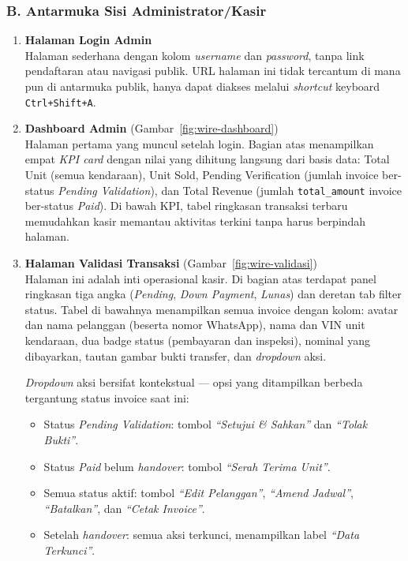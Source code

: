 \documentclass[11pt, a5paper]{article}
\begin{document}
\subsubsection*{B. Antarmuka Sisi Administrator/Kasir}

\begin{enumerate}[label=\arabic*.]
  \item \textbf{Halaman Login Admin}\\
        Halaman sederhana dengan kolom \textit{username} dan \textit{password},
        tanpa link pendaftaran atau navigasi publik. URL halaman ini tidak
        tercantum di mana pun di antarmuka publik, hanya dapat diakses melalui
        \textit{shortcut} keyboard \texttt{Ctrl+Shift+A}.

  \item \textbf{Dashboard Admin}
        (Gambar~\ref{fig:wire-dashboard})\\
        Halaman pertama yang muncul setelah login. Bagian atas menampilkan empat
        \textit{KPI card} dengan nilai yang dihitung langsung dari basis data:
        Total Unit (semua kendaraan), Unit Sold, Pending Verification (jumlah
        invoice ber-status \textit{Pending Validation}), dan Total Revenue
        (jumlah \texttt{total\_amount} invoice ber-status \textit{Paid}).
        Di bawah KPI, tabel ringkasan transaksi terbaru memudahkan kasir
        memantau aktivitas terkini tanpa harus berpindah halaman.

  \item \textbf{Halaman Validasi Transaksi}
        (Gambar~\ref{fig:wire-validasi})\\
        Halaman ini adalah inti operasional kasir. Di bagian atas terdapat
        panel ringkasan tiga angka (\textit{Pending}, \textit{Down Payment},
        \textit{Lunas}) dan deretan tab filter status. Tabel di bawahnya
        menampilkan semua invoice dengan kolom: avatar dan nama pelanggan
        (beserta nomor WhatsApp), nama dan VIN unit kendaraan, dua badge status
        (pembayaran dan inspeksi), nominal yang dibayarkan, tautan gambar bukti
        transfer, dan \textit{dropdown} aksi.

        \textit{Dropdown} aksi bersifat kontekstual — opsi yang ditampilkan
        berbeda tergantung status invoice saat ini:
        \begin{itemize}
          \item Status \textit{Pending Validation}: tombol \textit{``Setujui \&
                Sahkan''} dan \textit{``Tolak Bukti''}.
          \item Status \textit{Paid} belum \textit{handover}: tombol
                \textit{``Serah Terima Unit''}.
          \item Semua status aktif: tombol \textit{``Edit Pelanggan''},
                \textit{``Amend Jadwal''}, \textit{``Batalkan''}, dan
                \textit{``Cetak Invoice''}.
          \item Setelah \textit{handover}: semua aksi terkunci, menampilkan
                label \textit{``Data Terkunci''}.
        \end{itemize}


\end{enumerate}
\end{document}
